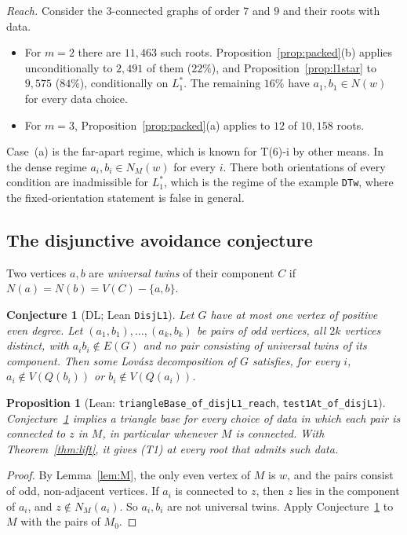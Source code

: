 \documentclass[11pt]{amsart}
\newtheorem{proposition}[theorem]{Proposition}
\newtheorem{conjecture}[theorem]{Conjecture}
\theoremstyle{definition}
\begin{document}
\emph{Reach.} Consider the $3$-connected graphs of order $7$ and $9$ and their roots with data.
\begin{itemize}[leftmargin=*]
\item For $m=2$ there are $11{,}463$ such roots. Proposition~\ref{prop:packed}(b) applies
unconditionally to $2{,}491$ of them ($22\%$), and Proposition~\ref{prop:l1star} to $9{,}575$
($84\%$), conditionally on $L_1^*$. The remaining $16\%$ have $a_1,b_1\in N(w)$ for every data choice.
\item For $m=3$, Proposition~\ref{prop:packed}(a) applies to $12$ of $10{,}158$ roots.
\end{itemize}
Case~(a) is the far-apart regime, which is known for T(6)-i by other means. In the dense regime
$a_i,b_i\in N_M(w)$ for every $i$. There both orientations of every condition are inadmissible for
$L_1^*$, which is the regime of the example \texttt{DTw}, where the fixed-orientation statement is false
in general.

\subsection{The disjunctive avoidance conjecture}

Two vertices $a,b$ are \emph{universal twins} of their component $C$ if $N(a)=N(b)=V(C)-\{a,b\}$.

\begin{conjecture}[DL; Lean \texttt{DisjL1}]\label{conj:dl}
Let $G$ have at most one vertex of positive even degree. Let $(a_1,b_1),\dots,(a_k,b_k)$ be pairs of
odd vertices, all $2k$ vertices distinct, with $a_ib_i\notin E(G)$ and no pair consisting of universal
twins of its component. Then some Lov\'asz decomposition of $G$ satisfies, for every $i$,
$a_i\notin V(Q(b_i))$ or $b_i\notin V(Q(a_i))$.
\end{conjecture}

\begin{proposition}[Lean: \texttt{triangleBase\_of\_disjL1\_reach}, \texttt{test1At\_of\_disjL1}]
\label{prop:dl}
Conjecture~\ref{conj:dl} implies a triangle base for every choice of data in which each pair is
connected to $z$ in $M$, in particular whenever $M$ is connected. With Theorem~\ref{thm:lift}, it
gives (T1) at every root that admits such data.
\end{proposition}

\begin{proof}
By Lemma~\ref{lem:M}, the only even vertex of $M$ is $w$, and the pairs consist of odd, non-adjacent
vertices. If $a_i$ is connected to $z$, then $z$ lies in the component of $a_i$, and $z\notin N_M(a_i)$.
So $a_i,b_i$ are not universal twins. Apply Conjecture~\ref{conj:dl} to $M$ with the pairs of $M_0$.
\end{proof}
\end{document}
